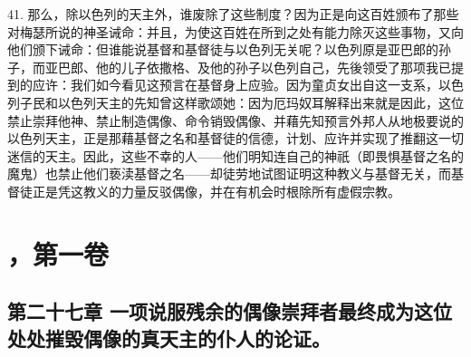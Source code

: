 41. 那么，除以色列的天主外，谁废除了这些制度？因为正是向这百姓颁布了那些对梅瑟所说的神圣诫命：并且，为使这百姓在所到之处有能力除灭这些事物，又向他们颁下诫命：但谁能说基督和基督徒与以色列无关呢？以色列原是亚巴郎的孙子，而亚巴郎、他的儿子依撒格、及他的孙子以色列自己，先後领受了那项我已提到的应许：我们如今看见这预言在基督身上应验。因为童贞女出自这一支系，以色列子民和以色列天主的先知曾这样歌颂她：因为厄玛奴耳解释出来就是因此，这位禁止崇拜他神、禁止制造偶像、命令销毁偶像、并藉先知预言外邦人从地极要说的以色列天主，正是那藉基督之名和基督徒的信德，计划、应许并实现了推翻这一切迷信的天主。因此，这些不幸的人——他们明知连自己的神祇（即畏惧基督之名的魔鬼）也禁止他们亵渎基督之名——却徒劳地试图证明这种教义与基督无关，而基督徒正是凭这教义的力量反驳偶像，并在有机会时根除所有虚假宗教。\par



\section{，第一卷}


\subsection{第二十七章 一项说服残余的偶像崇拜者最终成为这位处处摧毁偶像的真天主的仆人的论证。}

